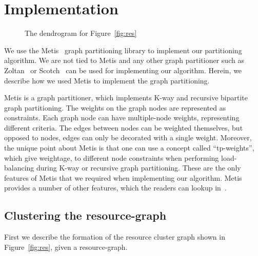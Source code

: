 \section{Implementation}
\label{sec:imple}


\begin{figure*}[t!]
  \centering
  \scalebox{0.4}{}
  \caption{The dendrogram for Figure~\ref{fig:res}}
  \label{fig:7}
\end{figure*}

We use the Metis~\cite{gkar95} graph partitioning library to implement
our partitioning algorithm. We are not tied to Metis and any other graph
partitioner such as Zoltan~\cite{kdev09} or Scotch~\cite{cche08} can be
used for implementing our algorithm. Herein, we describe how we used
Metis to implement the graph partitioning.

Metis is a graph partitioner, which implements K-way and recursive
bipartite graph partitioning. The weights on the graph nodes are
represented as constraints. Each graph node can have multiple-node
weights, representing different criteria. The edges between nodes can be
weighted themselves, but opposed to nodes, edges can only be decorated
with a single weight. Moreover, the unique point about Metis is that one
can use a concept called ``tp-weights'', which give weightage, to
different node constraints when performing load-balancing during K-way
or recursive graph partitioning. These are the only features of Metis
that we required when implementing our algorithm. Metis provides a
number of other features, which the readers can lookup in~\cite{gkar95}.

\subsection{Clustering the resource-graph}
\label{sec:clust-reso-graph}

First we describe the formation of the resource cluster graph shown in
Figure~\ref{fig:res}, given a resource-graph.

